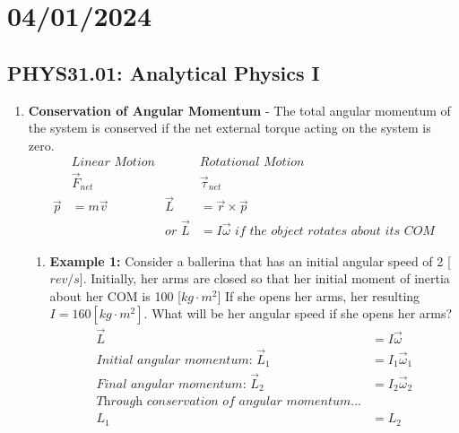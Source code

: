 \documentclass{article}
\begin{document}
\section*{04/01/2024}
\subsection*{PHYS31.01: Analytical Physics I}
        \begin{enumerate}
            \item \textbf{Conservation of Angular Momentum}
            - The total angular momentum of the system is conserved if the net external torque acting on the system is zero.
            \begin{align*}
                &\textit{Linear Motion}&&\textit{Rotational Motion} \\
                &\vec{F}_{net}&&\vec{\tau}_{net} \\
                \vec{p}&=m\vec{v}&\vec{L}&=\vec{r}\times\vec{p} \\
                &&\textit{or }\vec{L}&=I\vec{\omega}\textit{ if the object rotates about its COM}
            \end{align*}
            \begin{enumerate}
                \item \textbf{Example 1:}
                Consider a ballerina that has an initial angular speed of 2 [${rev}/{s}$]. Initially, her arms are closed so that her initial moment of inertia about her COM is 100 [${kg}\cdot{m^2}$]
                If she opens her arms, her resulting $I=160[{kg}\cdot{m^2}]$. What will be her angular speed if she opens her arms?
                \begin{align*}
                    \vec{L}&=I\vec{\omega} \\
                    \textit{Initial angular momentum: }\vec{L}_1&=I_1\vec{\omega}_1 \\
                    \textit{Final angular momentum: }\vec{L}_2&=I_2\vec{\omega}_2 \\
                    \textit{Through conservation of angular momentum...} \\
                    L_1&=L_2 \\

\end{align*}
\end{enumerate}
\end{enumerate}
\end{document}
